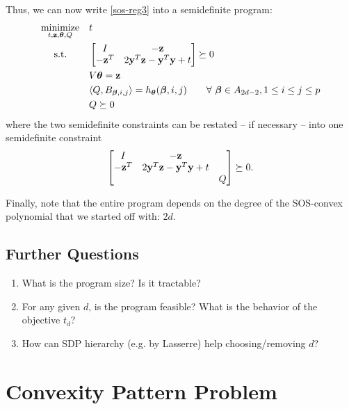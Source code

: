 \documentclass[11pt]{article}
\begin{document}
Thus, we can now write \eqref{sos-reg3} into a semidefinite program:
\begin{equation}\label{sos-reg4}
\begin{aligned}
& \underset{t, {\bf z}, {\boldsymbol\theta}, Q}{\text{minimize}}
& & t \\
& \text{\quad\ s.t.}
& & \begin{bmatrix} I & -{\bf z} \\ -{\bf z}^T & 2{\bf y}^T{\bf z} - {\bf y}^T{\bf y} + t \end{bmatrix} \succeq 0 \\
& & & V{\boldsymbol\theta} = {\bf z} \\
& & & \langle{Q, B_{{\boldsymbol\beta}, i, j}} \rangle = h_{\boldsymbol\theta}({\boldsymbol\beta}, i, j) \qquad \forall\ {\boldsymbol\beta} \in A_{2d - 2}, 1 \le i \le j \le p \\
& & & Q \succeq 0 
\end{aligned}
\end{equation}
where the two semidefinite constraints can be restated -- if necessary -- into one semidefinite constraint
\[
\begin{bmatrix} I & -{\bf z} &  \\ -{\bf z}^T & 2{\bf y}^T{\bf z} - {\bf y}^T{\bf y} + t & \\ & & Q \end{bmatrix} \succeq 0.
\]

Finally, note that the entire program depends on the degree of the SOS-convex polynomial that we started off with: $2d$. 

\subsection*{Further Questions}

\begin{enumerate}
\item What is the program size? Is it tractable?
\item For any given $d$, is the program feasible? What is the behavior of the objective $t_d$?
\item How can SDP hierarchy (e.g. by Lasserre) help choosing/removing $d$?
\end{enumerate}

\clearpage
\section{Convexity Pattern Problem}
\end{document}
